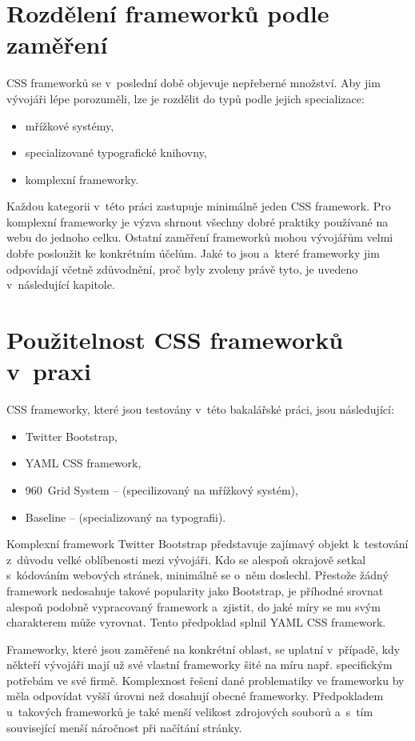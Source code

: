 \documentclass[thesis=B,czech]{FITthesis}[2012/06/26]
\begin{document}
\section{Rozdělení frameworků podle zaměření}

\gls{CSS} frameworků se v~poslední době objevuje nepřeberné množství. Aby jim vývojáři lépe porozuměli, lze je rozdělit do typů podle jejich specializace:

\begin{itemize}
 \item mřížkové systémy,
 \item specializované typografické knihovny,
 \item komplexní frameworky.
\end{itemize}
Každou kategorii v~této práci zastupuje minimálně jeden \gls{CSS} framework. Pro komplexní frameworky je výzva shrnout všechny dobré praktiky používané na webu do jednoho celku. Ostatní zaměření frameworků mohou vývojářům velmi dobře posloužit ke konkrétním účelům. Jaké to jsou a~které frameworky jim odpovídají včetně zdůvodnění, proč byly zvoleny právě tyto, je uvedeno v~následující kapitole.


\section{Použitelnost CSS frameworků v~praxi}

\gls{CSS} frameworky, které jsou testovány v~této bakalářské práci, jsou následující:

\begin{itemize}
 \item Twitter Bootstrap,
 \item \gls{YAML} \gls{CSS} framework,
 \item 960~Grid System -- (specilizovaný na mřížkový systém),
 \item Baseline -- (specializovaný na typografii).
\end{itemize}
Komplexní framework Twitter Bootstrap představuje zajímavý objekt k~testování z~důvodu velké oblíbenosti mezi vývojáři. Kdo se alespoň okrajově setkal s~kódováním webových stránek, minimálně se o~něm doslechl. Přestože žádný framework nedosahuje takové popularity jako Bootstrap, je příhodné srovnat alespoň podobně vypracovaný framework a~zjistit, do jaké míry se mu svým charakterem může vyrovnat. Tento předpoklad splnil \gls{YAML} \gls{CSS} framework.

Frameworky, které jsou zaměřené na konkrétní oblast, se uplatní v~případě, kdy někteří vývojáři mají už své vlastní frameworky šité na míru např. specifickým potřebám ve své firmě. Komplexnost řešení dané problematiky ve frameworku by měla odpovídat vyšší úrovni než dosahují obecné frameworky. Předpokladem u~takových frameworků je také menší velikost zdrojových souborů a~s~tím související menší náročnost při načítání stránky.  
\end{document}
